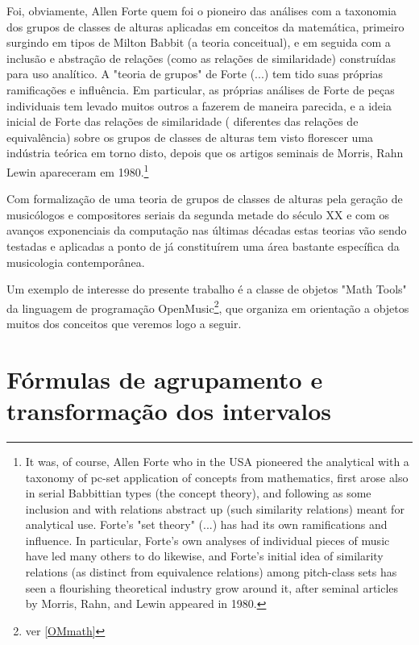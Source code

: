 \documentclass[
	12pt,				%
	openright,			%
	twoside,			%
	a4paper,			%
	english,			%
	french,				%
	spanish,			%
	brazil				%
	]{abntex2}
\begin{document}
\begin{citacao}
Foi, obviamente, Allen Forte quem foi o pioneiro das análises com a taxonomia dos grupos de classes de alturas aplicadas em conceitos da matemática, primeiro surgindo em tipos de Milton Babbit (a teoria conceitual), e em seguida com a inclusão e abstração de relações (como as relações de similaridade) construídas para uso analítico. A "teoria de grupos" de Forte (...) tem tido suas próprias ramificações e influência. Em particular, as próprias análises de Forte de peças individuais tem levado muitos outros a fazerem de maneira parecida, e a ideia inicial de Forte das relações de similaridade ( diferentes das relações de equivalência) sobre os grupos de classes de alturas tem visto florescer uma indústria teórica em torno disto, depois que os artigos seminais de Morris, Rahn  Lewin apareceram em 1980.\cite{rahn2004swerve}\footnote{
It was, of course, Allen Forte who in the USA pioneered the analytical with a taxonomy of pc-set application of concepts from mathematics, first arose also in serial Babbittian types (the concept theory), and following as some inclusion and with relations abstract up (such similarity relations) meant for analytical use. Forte's "set theory" (...) has had its own ramifications and influence. In particular, Forte's own analyses of individual pieces of music have led many others to do likewise, and Forte's initial idea of similarity relations (as distinct from equivalence relations) among pitch-class sets has seen a flourishing theoretical industry grow around it, after seminal articles by Morris, Rahn, and Lewin appeared in 1980.\cite{rahn2004swerve}}
\end{citacao}




Com formalização de uma teoria de grupos de classes de alturas pela geração de musicólogos e compositores seriais da segunda metade do século XX e com os avanços exponenciais da computação nas últimas décadas estas teorias vão sendo testadas e aplicadas a ponto de já constituírem uma área bastante específica da musicologia contemporânea.\cite{aroundset2013}

Um exemplo de interesse do presente trabalho é a classe de objetos "Math Tools"\cite{andreatta2003implementing,AndreataOMtutorial,DebrilOM} da linguagem de programação OpenMusic\footnote{ver \autoref{OMmath}}, que organiza em orientação a objetos muitos dos conceitos que veremos logo a seguir. 



\section{Fórmulas de agrupamento e transformação dos intervalos}
\end{document}
